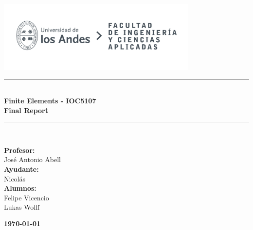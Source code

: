 \documentclass{article}  %
\begin{document}
\begin{titlepage}%
\newcommand{\HRule}{\rule{\linewidth}{0.5mm}} 
\center 
\includegraphics[width=10cm]{LOGO_UNIVERSIDAD.jpg}\\ %
\vspace{3cm}
\HRule \\[0.4cm]
{ \huge \bfseries Finite Elements - IOC5107}\\[0.4cm] %
{ \huge \bfseries Final Report}\\[0.4cm] %
\HRule \\[1.5cm]
 \vspace{5cm}
\begin{flushright}
  { \textbf{Profesor:}\\
  José Antonio Abell\\
  \textbf{Ayudante:}\\
  Nicolás\\
  \textbf{Alumnos:} \\
  Felipe Vicencio\\
  Lukas Wolff\\
}
\end{flushright}
\vspace{1cm}
{\large \textbf{\today}}\\[2cm] %
\end{titlepage}
\end{document}
